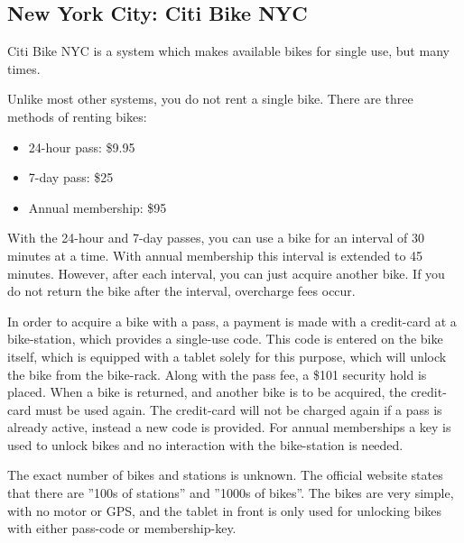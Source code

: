 \subsection{New York City: Citi Bike NYC}
Citi Bike NYC\cite{nyc_citibike} is a system which makes available bikes for single use, but many times.

Unlike most other systems, you do not rent a single bike.
There are three methods of renting bikes:

\begin{itemize}
\item 24-hour pass: \$9.95
\item 7-day pass: \$25
\item Annual membership: \$95
\end{itemize}

With the 24-hour and 7-day passes, you can use a bike for an interval of 30 minutes at a time.
With annual membership this interval is extended to 45 minutes.
However, after each interval, you can just acquire another bike.
If you do not return the bike after the interval, overcharge fees occur.

In order to acquire a bike with a pass, a payment is made with a credit-card at a bike-station, which provides a single-use code.
This code is entered on the bike itself, which is equipped with a tablet solely for this purpose, which will unlock the bike from the bike-rack.
Along with the pass fee, a \$101 security hold is placed.
When a bike is returned, and another bike is to be acquired, the credit-card must be used again.
The credit-card will not be charged again if a pass is already active, instead a new code is provided.
For annual memberships a key is used to unlock bikes and no interaction with the bike-station is needed.

The exact number of bikes and stations is unknown.
The official website states that there are ''100s of stations'' and ''1000s of bikes''.
The bikes are very simple, with no motor or GPS, and the tablet in front is only used for unlocking bikes with either pass-code or membership-key.